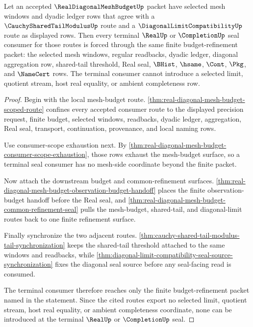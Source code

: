 
\begin{theorem}
\label{thm:real-diagonal-mesh-budget-terminal-budget-refinement}
Let an accepted $\RealDiagonalMeshBudgetUp$ packet have selected mesh windows and dyadic ledger rows that agree with a $\CauchySharedTailModulusUp$ route and a $\DiagonalLimitCompatibilityUp$ route as displayed rows. Then every terminal $\RealUp$ or $\CompletionUp$ seal consumer for those routes is forced through the same finite budget-refinement packet: the selected mesh windows, regular readbacks, dyadic ledger, diagonal aggregation row, shared-tail threshold, Real seal, $\BHist$, $\hsame$, $\Cont$, $\Pkg$, and $\NameCert$ rows. The terminal consumer cannot introduce a selected limit, quotient stream, host real equality, or ambient completeness row.
\end{theorem}
\begin{proof}
Begin with the local mesh-budget route. \autoref{thm:real-diagonal-mesh-budget-scoped-route} confines every accepted consumer route to the displayed precision request, finite budget, selected windows, readbacks, dyadic ledger, aggregation, Real seal, transport, continuation, provenance, and local naming rows.

Use consumer-scope exhaustion next. By \autoref{thm:real-diagonal-mesh-budget-consumer-scope-exhaustion}, those rows exhaust the mesh-budget surface, so a terminal seal consumer has no mesh-side coordinate beyond the finite packet.

Now attach the downstream budget and common-refinement surfaces. \autoref{thm:real-diagonal-mesh-budget-observation-budget-handoff} places the finite observation-budget handoff before the Real seal, and \autoref{thm:real-diagonal-mesh-budget-common-refinement-seal} pulls the mesh-budget, shared-tail, and diagonal-limit routes back to one finite refinement surface.

Finally synchronize the two adjacent routes. \autoref{thm:cauchy-shared-tail-modulus-tail-synchronization} keeps the shared-tail threshold attached to the same windows and readbacks, while \autoref{thm:diagonal-limit-compatibility-seal-source-synchronization} fixes the diagonal seal source before any seal-facing read is consumed.

The terminal consumer therefore reaches only the finite budget-refinement packet named in the statement. Since the cited routes export no selected limit, quotient stream, host real equality, or ambient completeness coordinate, none can be introduced at the terminal $\RealUp$ or $\CompletionUp$ seal.
\end{proof}

